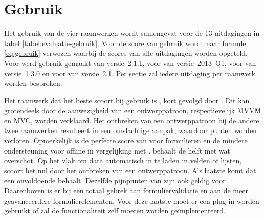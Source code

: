 \section{Gebruik}
\label{sec:evaluatie-gebruik}
Het gebruik van de vier raamwerken wordt samengevat voor de $13$ uitdagingen in tabel \ref{tabel:evaluatie-gebruik}.
Voor de score van gebruik wordt naar formule \ref{eq:gebruik} verwezen waarbij de scores van alle uitdagingen worden opgeteld.
Voor \st{} werd gebruik gemaakt van versie~2.1.1, voor \kendo{} van versie~2013~Q1, voor \jqm{} van versie~1.3.0 en voor \lungo{} van versie~2.1.
Per sectie zal iedere uitdaging per raamwerk worden besproken.

\begin{table}
\centering
{}
\caption{Overzicht van gebruik.}
\label{tabel:evaluatie-gebruik}
\end{table}

Het raamwerk dat het beste scoort bij gebruik is \kendo{}, kort gevolgd door \st{}.
Dit kan grotendeels door de aanwezigheid van een ontwerppatroon, respectievelijk MVVM en MVC, worden verklaard.
Het ontbreken van een ontwerppatroon bij de andere twee raamwerken resulteert in een omslachtige aanpak, waardoor punten worden verloren.
Opmerkelijk is de perfecte score van \kendo{} voor formulieren en de mindere ondersteuning voor offline in vergelijking met \st{}.
\jqm{} behaalt de helft met wat overschot.
Op het vlak om data automatisch in te laden in velden of lijsten, scoort het nul door het ontbreken van een ontwerppatroon. 
Als laatste komt \lungo{} dat een onvoldoende behaalt.
Dezelfde pijnpunten van \jqm{} zijn ook geldig voor \lungo{}.
Daarenboven is er bij \lungo{} een totaal gebrek aan formuliervalidatie en aan de meer geavanceerdere formulierelementen.
Voor deze laatste moet er een plug-in worden gebruikt of zal de functionaliteit zelf moeten worden geïmplementeerd. 

